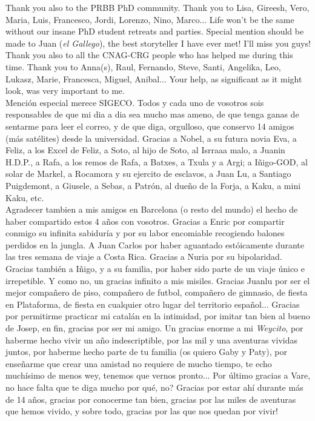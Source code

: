 \documentclass[11pt, b5paper,twoside]{tesi_upf}
\begin{document}
Thank you also to the PRBB PhD community. Thank you to Lisa, Gireesh, Vero, Maria, Luis, Francesco, Jordi, Lorenzo, Nino, Marco... Life won't be the same without our insane PhD student retreats and parties. Special mention should be made to Juan (\textit{el Gallego}), the best storyteller I have ever met! I'll miss you guys! \\
Thank you also to all the CNAG-CRG people who has helped me during this time. Thank you to Anna(s), Raul, Fernando, Steve, Santi, Angelika, Leo, Lukasz, Marie, Francesca, Miguel, Anibal...  Your help, as significant as it might look, was very important to me. \\
Mención especial merece SIGECO. Todos y cada uno de vosotros sois responsables de que mi dia a dia sea mucho mas ameno, de que tenga ganas de sentarme para leer el correo, y de que diga, orgulloso, que conservo 14 amigos (más satélites) desde la universidad. Gracias a Nobel, a su futura novia Eva, a Feliz, a los Excel de Feliz, a Soto, al hijo de Soto, al Isrraaa malo, a Juanin H.D.P., a Rafa, a los remos de Rafa, a Batxes, a Txula y a Argi; a Iñigo-GOD, al solar de Markel, a Rocamora y su ejercito de esclavos, a Juan Lu, a Santiago Puigdemont, a Giusele, a Sebas, a Patrón, al dueño de la Forja, a Kaku, a mini Kaku, etc.          \\ 
Agradecer tambien a mis amigos en Barcelona (o resto del mundo) el hecho de haber compartido estos 4 años con vosotros. Gracias a Enric por compartir conmigo su infinita sabiduría y por su labor encomiable recogiendo balones perdidos en la jungla. A Juan Carlos por haber aguantado estóicamente durante las tres semana de viaje a Costa Rica. Gracias a Nuria por su bipolaridad. Gracias también a Iñigo, y a su familia, por haber sido parte de un viaje único e irrepetible. Y como no, un gracias infinito a mis misiles. Gracias Juanlu por ser el mejor compañero de piso, compañero de futbol, compañero de gimnasio, de fiesta en Plataforma, de fiesta en cualquier otro lugar del territorio español... Gracias por permitirme practicar mi catalán en la intimidad, por imitar tan bien al bueno de Josep, en fin, gracias por ser mi amigo. Un gracias enorme a mi \textit{Weycito}, por haberme hecho vivir un año indescriptible, por las mil y una aventuras vividas juntos, por haberme hecho parte de tu familia (os quiero Gaby y Paty), por enseñarme que crear una amistad no requiere de mucho tiempo, te echo muchísimo de menos wey, tenemos que vernos pronto... Por último gracias a Vare, no hace falta que te diga mucho por qué, no?  Gracias por estar ahí durante más de 14 años, gracias por conocerme tan bien, gracias por las miles de aventuras que hemos vivido, y sobre todo, gracias por las que nos quedan por vivir! \\
\end{document}
